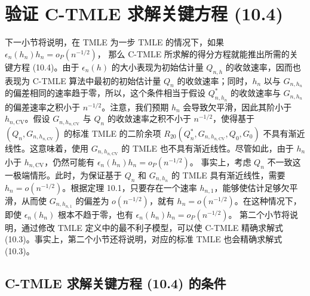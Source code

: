 \section{验证 C-TMLE 求解关键方程 (10.4)}
\label{sec:ch10-verifying-critical-equation}

下一小节将说明，在 TMLE 为一步 TMLE 的情况下，如果
$\epsilon_n(h_n)h_n=o_P(n^{-1/2})$，
那么 C-TMLE 所求解的得分方程就能推出所需的关键方程 (10.4)。由于 $\epsilon_n(h)$ 的大小表现为初始估计量 $Q_{n,h}$ 的收敛速率，因而也表现为 C-TMLE 算法中最初的初始估计量 $Q_n$ 的收敛速率；同时，$h_n$ 以与 $G_{n,h_n}$ 的偏差相同的速率趋于零，所以，这个条件相当于假设 $Q_{n,h_n}^*$ 的收敛速率与 $G_{n,h_n}$ 的偏差速率之积小于 $n^{-1/2}$。注意，我们预期 $h_n$ 会导致欠平滑，因此其阶小于 $h_{n,\mathrm{CV}}$。假设 $G_{n,h_{n,\mathrm{CV}}}$ 与 $Q_n$ 的收敛速率之积不小于 $n^{-1/2}$，使得基于 $(Q_n,G_{n,h_{n,\mathrm{CV}}})$ 的标准 TMLE 的二阶余项
$R_{20}(Q_n^*,G_{n,h_{n,\mathrm{CV}}},Q_0,G_0)$
不具有渐近线性。这意味着，使用 $G_{n,h_{n,\mathrm{CV}}}$ 的 TMLE 也不具有渐近线性。尽管如此，由于 $h_n$ 小于 $h_{n,\mathrm{CV}}$，仍然可能有
$\epsilon_n(h_n)h_n=o_P(n^{-1/2})$。
事实上，考虑 $Q_n$ 不一致这一极端情形。此时，为保证基于 $Q_n$ 和 $G_{n,h_n}$ 的 TMLE 具有渐近线性，需要 $h_n=o(n^{-1/2})$。根据定理 10.1，只要存在一个速率 $h_{n,1}$，能够使估计足够欠平滑，从而使 $G_{n,h_{n,1}}$ 的偏差为 $o(n^{-1/2})$，就有 $h_n=o(n^{-1/2})$。在这种情况下，即使 $\epsilon_n(h_n)$ 根本不趋于零，也有
$\epsilon_n(h_n)h_n=o_P(n^{-1/2})$。
第二个小节将说明，通过修改 TMLE 定义中的最不利子模型，可以使 C-TMLE 精确求解式 (10.3)。事实上，第二个小节还将说明，对应的标准 TMLE 也会精确求解式 (10.3)。

\subsection{C-TMLE 求解关键方程 (10.4) 的条件}
\label{subsec:ch10-critical-equation-condition}

